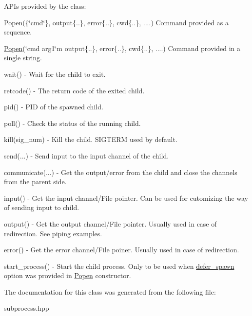 A\+PI\textquotesingle{}s provided by the class\+:
\begin{DoxyEnumerate}
\item \hyperlink{classsubprocess_1_1Popen}{Popen}(\{\char`\"{}cmd\char`\"{}\}, output\{..\}, error\{..\}, cwd\{..\}, ....) Command provided as a sequence.
\item \hyperlink{classsubprocess_1_1Popen}{Popen}(\char`\"{}cmd arg1\char`\"{}m output\{..\}, error\{..\}, cwd\{..\}, ....) Command provided in a single string.
\item wait() -\/ Wait for the child to exit.
\item retcode() -\/ The return code of the exited child.
\item pid() -\/ P\+ID of the spawned child.
\item poll() -\/ Check the status of the running child.
\item kill(sig\+\_\+num) -\/ Kill the child. S\+I\+G\+T\+E\+RM used by default.
\item send(...) -\/ Send input to the input channel of the child.
\item communicate(...) -\/ Get the output/error from the child and close the channels from the parent side.
\end{DoxyEnumerate}

input() -\/ Get the input channel/\+File pointer. Can be used for cutomizing the way of sending input to child.
\begin{DoxyEnumerate}
\item output() -\/ Get the output channel/\+File pointer. Usually used in case of redirection. See piping examples.
\item error() -\/ Get the error channel/\+File poiner. Usually used in case of redirection.
\item start\+\_\+process() -\/ Start the child process. Only to be used when {\ttfamily \hyperlink{structsubprocess_1_1defer__spawn}{defer\+\_\+spawn}} option was provided in \hyperlink{classsubprocess_1_1Popen}{Popen} constructor. 
\end{DoxyEnumerate}

The documentation for this class was generated from the following file\+:\begin{DoxyCompactItemize}
\item 
subprocess.\+hpp\end{DoxyCompactItemize}
